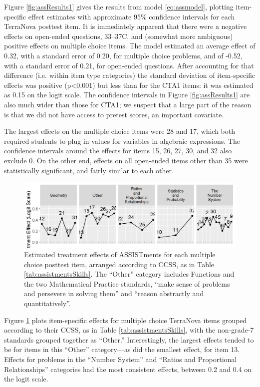 \documentclass{edm_article}
\begin{document}
Figure \ref{fig:assResults1} gives the results from model
\eqref{eq:assmodel}, plotting item-specific effect estimates with
approximate 95\% confidence intervals for each TerraNova posttest
item.
It is immediately apparent that there were a negative effects on
open-ended questions, 33--37C, and (somewhat more ambiguous) positive
effects on multiple choice items.
The model estimated an average effect of 0.32, with a standard error
of 0.20, for multiple choice problems, and of -0.52, with a standard
error of 0.21, for open-ended questions.
After accounting for that difference (i.e. within item type
categories) the standard deviation of item-specific effects was positive
(p<0.001) but less than for the CTA1 items: it was estimated as 0.15
on the logit scale.
The confidence intervals in Figure \ref{fig:assResults1} are also much
wider than those for CTA1; we suspect that a large part of the reason
is that we did not have access to pretest scores, an important
covariate.

The largest effects on the multiple choice items were 28 and 17, which both
required students to plug in values for variables in algebraic
expressions. The confidence intervals around the effects for items 15,
26, 27, 30, and 32 also exclude 0.
On the other end, effects on all open-ended items other than 35 were
statistically significant, and fairly similar to each other. 

\begin{figure}
  \centering
  \includegraphics{../assEffectsType.jpg}
  \caption{Estimated treatment effects of ASSISTments for each
    multiple choice
    posttest item, arranged according to CCSS, as in Table
    \ref{tab:assistmentsSkills}. The ``Other'' category includes
    Functions and the two Mathematical Practice standards, ``make
    sense of problems and persevere in solving them'' and ``reason
    abstractly and quantitatively''.}
  \label{fig:assResults2}
\end{figure}

Figure \ref{fig:assResults2} plots item-specific effects for multiple
choice TerraNova items grouped according to their CCSS, as in Table
\ref{tab:assistmentsSkills}, with the non-grade-7 standards grouped
together as ``Other.''
Interestingly, the largest effects tended to be for items in this
``Other'' category---as did the smallest effect, for item 13.
Effects for problems in the ``Number System'' and ``Ratios and
Proportional Relationships'' categories had the most
consistent effects, between 0.2 and 0.4 on the logit scale. 
\end{document}
